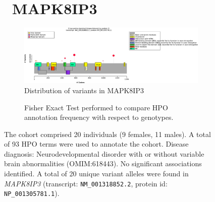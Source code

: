 \begin{figure}[htbp]
\section*{ MAPK8IP3}
\centering
\begin{subfigure}[b]{0.95\textwidth}
\centering
\includegraphics[width=\textwidth]{ img/MAPK8IP3_protein_diagram.pdf} 
\captionsetup{justification=raggedright,singlelinecheck=false}
\caption{Distribution of variants in MAPK8IP3}
\end{subfigure}

\vspace{2em}

\begin{subfigure}[b]{0.95\textwidth}
\centering
{}
\captionsetup{justification=raggedright,singlelinecheck=false}
\caption{Fisher Exact Test performed to compare HPO annotation frequency with respect to genotypes.}
\end{subfigure}

\vspace{2em}

\caption{The cohort comprised 20 individuals (9 females, 11 males). A total of 93 HPO terms were used to annotate the cohort. 
Disease diagnosis: Neurodevelopmental disorder with or without variable brain abnormalities (OMIM:618443). No significant associations identified. 
A total of 20 unique variant alleles were found in \textit{MAPK8IP3} (transcript: \texttt{NM\_001318852.2}, protein id: \texttt{NP\_001305781.1}).}
\end{figure}
